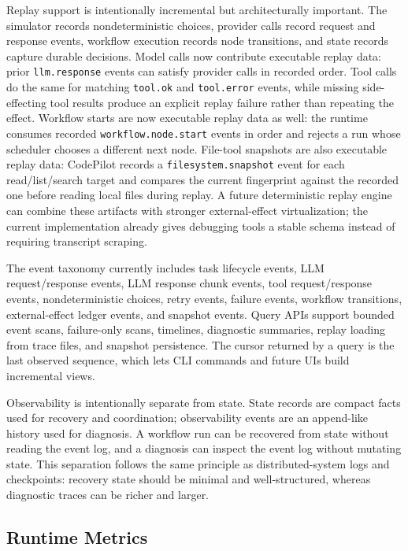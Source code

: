 \documentclass[manuscript,screen,review]{acmart}
\begin{document}
Replay support is intentionally incremental but architecturally important. The
simulator records nondeterministic choices, provider calls record request and
response events, workflow execution records node transitions, and state records
capture durable decisions. Model calls now contribute executable replay data:
prior \texttt{llm.response} events can satisfy provider calls in recorded order.
Tool calls do the same for matching \texttt{tool.ok} and \texttt{tool.error}
events, while missing side-effecting tool results produce an explicit replay
failure rather than repeating the effect. Workflow starts are now executable
replay data as well: the runtime consumes recorded
\texttt{workflow.node.start} events in order and rejects a run whose scheduler
chooses a different next node. File-tool snapshots are also executable replay
data: CodePilot records a \texttt{filesystem.snapshot} event for each
read/list/search target and compares the current fingerprint against the
recorded one before reading local files during replay. A future deterministic
replay engine can combine these artifacts with stronger external-effect
virtualization; the current implementation already gives debugging tools a
stable schema instead of requiring transcript scraping.

The event taxonomy currently includes task lifecycle events, LLM request/response
events, LLM response chunk events, tool request/response events,
nondeterministic choices, retry events, failure events, workflow transitions,
external-effect ledger events, and snapshot events. Query APIs support
bounded event scans, failure-only scans, timelines, diagnostic summaries, replay
loading from trace files, and snapshot persistence. The cursor returned by a
query is the last observed sequence, which lets CLI commands and future UIs build
incremental views.

Observability is intentionally separate from state. State records are compact
facts used for recovery and coordination; observability events are an append-like
history used for diagnosis. A workflow run can be recovered from state without
reading the event log, and a diagnosis can inspect the event log without
mutating state. This separation follows the same principle as distributed-system
logs and checkpoints: recovery state should be minimal and well-structured,
whereas diagnostic traces can be richer and larger.

\subsection{Runtime Metrics}
\end{document}
